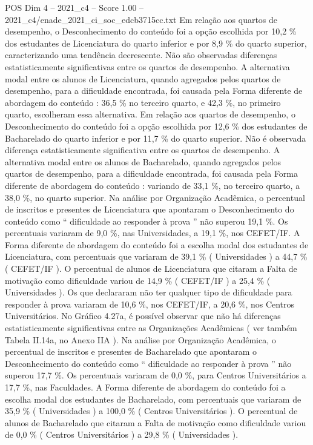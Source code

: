 \begin{textsample}{POS Dim 4 – 2021\_c4 – Score 1.00 – 2021\_c4/enade\_2021\_ci\_soc\_edcb3715cc.txt}
Em relação aos quartos de desempenho, o Desconhecimento do conteúdo foi a opção escolhida por 10,2 \% dos estudantes de Licenciatura do quarto inferior e por 8,9 \% do quarto superior, caracterizando uma tendência decrescente.
Não são observadas diferenças estatisticamente significativas entre os quartos de desempenho.
A alternativa modal entre os alunos de Licenciatura, quando agregados pelos quartos de desempenho, para a dificuldade encontrada, foi causada pela Forma diferente de abordagem do conteúdo : 36,5 \% no terceiro quarto, e 42,3 \%, no primeiro quarto, escolheram essa alternativa.
Em relação aos quartos de desempenho, o Desconhecimento do conteúdo foi a opção escolhida por 12,6 \% dos estudantes de Bacharelado do quarto inferior e por 11,7 \% do quarto superior.
Não é observada diferença estatisticamente significativa entre os quartos de desempenho.
A alternativa modal entre os alunos de Bacharelado, quando agregados pelos quartos de desempenho, para a dificuldade encontrada, foi causada pela Forma diferente de abordagem do conteúdo : variando de 33,1 \%, no terceiro quarto, a 38,0 \%, no quarto superior.
Na análise por Organização Acadêmica, o percentual de inscritos e presentes de Licenciatura que apontaram o Desconhecimento do conteúdo como “ dificuldade ao responder à prova ” não superou 19,1 \%.
Os percentuais variaram de 9,0 \%, nas Universidades, a 19,1 \%, nos CEFET/IF.
A Forma diferente de abordagem do conteúdo foi a escolha modal dos estudantes de Licenciatura, com percentuais que variaram de 39,1 \% ( Universidades ) a 44,7 \% ( CEFET/IF ).
O percentual de alunos de Licenciatura que citaram a Falta de motivação como dificuldade variou de 14,9 \% ( CEFET/IF ) a 25,4 \% ( Universidades ).
Os que declararam não ter qualquer tipo de dificuldade para responder à prova variaram de 10,6 \%, nos CEFET/IF, a 20,6 \%, nos Centros Universitários.
No Gráfico 4.27a, é possível observar que não há diferenças estatisticamente significativas entre as Organizações Acadêmicas ( ver também Tabela II.14a, no Anexo IIA ).
Na análise por Organização Acadêmica, o percentual de inscritos e presentes de Bacharelado que apontaram o Desconhecimento do conteúdo como “ dificuldade ao responder à prova ” não superou 17,7 \%.
Os percentuais variaram de 0,0 \%, para Centros Universitários a 17,7 \%, nas Faculdades.
A Forma diferente de abordagem do conteúdo foi a escolha modal dos estudantes de Bacharelado, com percentuais que variaram de 35,9 \% ( Universidades ) a 100,0 \% ( Centros Universitários ).
O percentual de alunos de Bacharelado que citaram a Falta de motivação como dificuldade variou de 0,0 \% ( Centros Universitários ) a 29,8 \% ( Universidades ).

\end{textsample}
